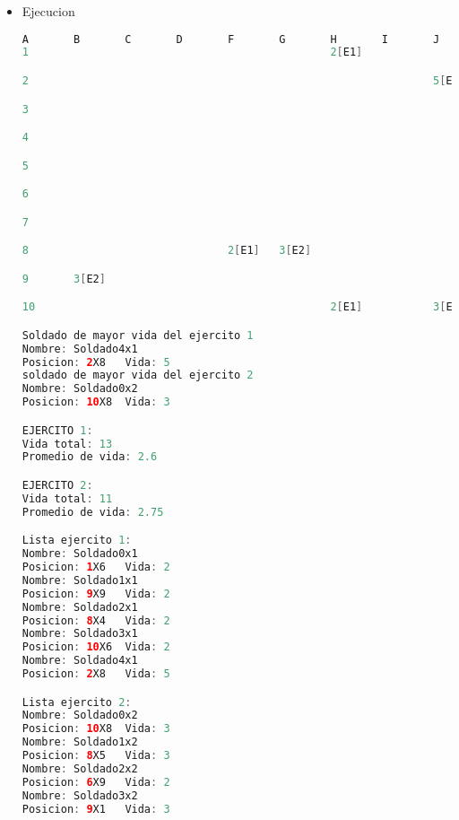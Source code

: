 \documentclass{article}
\begin{document}
\begin{itemize}
\begin{itemize}
\begin{lstlisting}[language=java]
    public int setNivelVida() {
        this.nivelVida = nivelVida;
    }

    public void setNivelAtaque(int nivelAtaque) {
        this.nivelAtaque = nivelAtaque;
    }

    public int getNivelDefensa() {
        return nivelDefensa;
    }

    public void setNivelDefensa(int nivelDefensa) {
        this.nivelDefensa = nivelDefensa;
    }

    public boolean isVive() {
        return vive;
    }

    public void setVive(boolean vive) {
        this.vive = vive;
    }
}
        \end{lstlisting}

        
        \item Ejecucion
        \begin{lstlisting}[language=java]
            A       B       C       D       F       G       H       I       J
1                                               2[E1]

2                                                               5[E1]

3

4

5

6                                                                       2[E2]

7

8                               2[E1]   3[E2]

9       3[E2]                                                           2[E1]

10                                              2[E1]           3[E2]

Soldado de mayor vida del ejercito 1
Nombre: Soldado4x1
Posicion: 2X8   Vida: 5
soldado de mayor vida del ejercito 2
Nombre: Soldado0x2
Posicion: 10X8  Vida: 3

EJERCITO 1:
Vida total: 13
Promedio de vida: 2.6

EJERCITO 2:
Vida total: 11
Promedio de vida: 2.75

Lista ejercito 1:
Nombre: Soldado0x1
Posicion: 1X6   Vida: 2
Nombre: Soldado1x1
Posicion: 9X9   Vida: 2
Nombre: Soldado2x1
Posicion: 8X4   Vida: 2
Nombre: Soldado3x1
Posicion: 10X6  Vida: 2
Nombre: Soldado4x1
Posicion: 2X8   Vida: 5

Lista ejercito 2:
Nombre: Soldado0x2
Posicion: 10X8  Vida: 3
Nombre: Soldado1x2
Posicion: 8X5   Vida: 3
Nombre: Soldado2x2
Posicion: 6X9   Vida: 2
Nombre: Soldado3x2
Posicion: 9X1   Vida: 3


\end{lstlisting}
\end{itemize}
\end{itemize}
\end{document}
